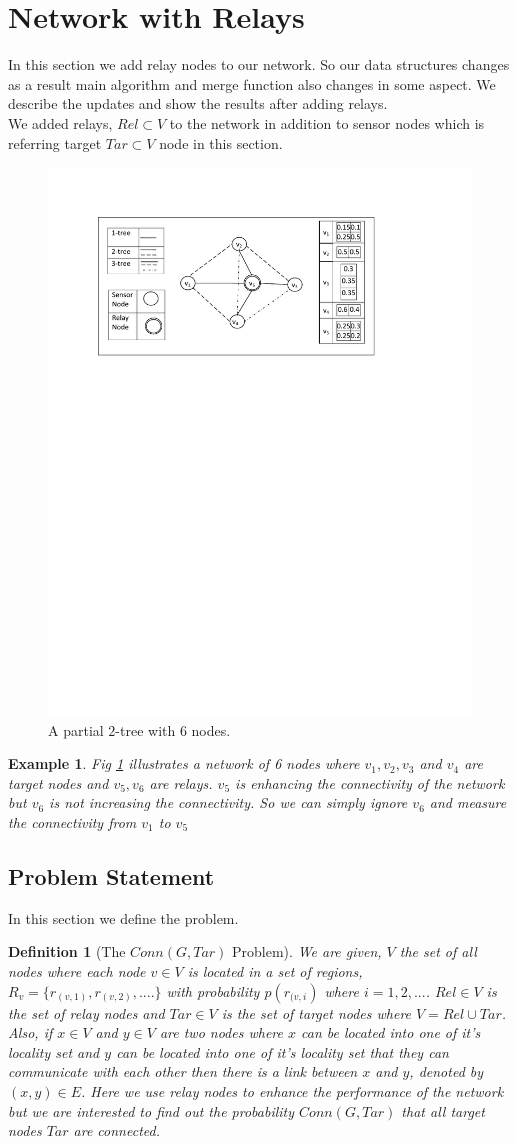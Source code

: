 \documentclass[12pt]{article}
\newtheorem*{defi}{Definition}
\newtheorem{exmp}{Example}[section]
\begin{document}
\section{Network with Relays}
In this section we add relay nodes to our network. So our data structures changes as a result main algorithm and merge function also changes in some aspect. We describe the updates and show the results after adding relays.\\
We added relays, $Rel\subset V$ to the network in addition to sensor nodes which is referring target $Tar\subset V$ node in this section.
\begin{figure}[h]

\centering
\includegraphics[width=6 in, height=2.5 in]{Relay.pdf}
 \caption{A partial \(2\)-tree with \(6\) nodes.
}
\label{fig:relay1}
\end{figure}
\begin{exmp}
\normalfont
Fig \ref{fig:relay1} illustrates a network of 6 nodes where $v_1,v_2,v_3$ and $v_4$ are target nodes and $v_5, v_6$ are relays. $v_5$ is enhancing the connectivity of the network but $v_6$ is not  increasing the connectivity. So we can simply ignore $v_6$ and measure the connectivity from $v_1$ to $v_5$
\end{exmp}
\subsection{Problem Statement}
In this section we define the problem.
\begin{defi}[The $Conn(G,Tar)$ Problem]
\normalfont
We are given, $V$ the set of all nodes where each node $v\in V$ is located in a set of regions, $R_v=\{r_{(v,1)},r_{(v,2)},....\}$  with probability $p(r_{(v,i})$ where $i=1,2,...$.
$Rel\in V$ is the set of relay nodes and $Tar\in V$ is the set of target nodes where $V=Rel\cup Tar$. Also, if $x\in V$ and $y\in V$ are two nodes where $x$ can be located into one of it's locality set and $y$ can be located into one of it's locality set that they can communicate with each other then there is a link between $x$ and $y$, denoted by $(x,y)\in E$. Here we use relay nodes to enhance the performance of the network but we are interested to find out the probability $Conn(G,Tar)$ that all target nodes $Tar$ are connected.
\end{defi}
\end{document}
